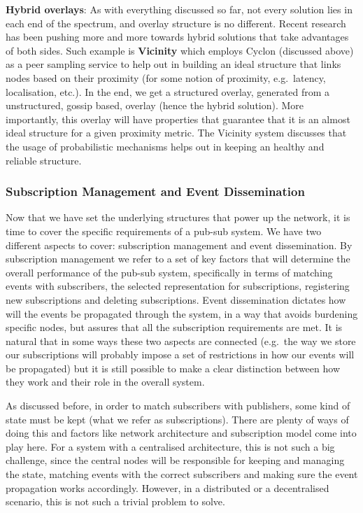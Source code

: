\textbf{Hybrid overlays}: As with everything discussed so far, not every
solution lies in each end of the spectrum, and overlay structure is no
different. Recent research has been pushing more and more towards hybrid
solutions that take advantages of both sides. Such example is
\textbf{Vicinity} \cite{Voulgaris2013} which employs Cyclon
(discussed above) as a peer sampling service to help out in building an
ideal structure that links nodes based on their proximity (for some
notion of proximity, e.g.~latency, localisation, etc.). In the end, we
get a structured overlay, generated from a unstructured, gossip based,
overlay (hence the hybrid solution). More importantly, this overlay will
have properties that guarantee that it is an almost ideal structure for
a given proximity metric. The Vicinity system discusses that the usage
of probabilistic mechanisms helps out in keeping an healthy and reliable
structure.

\subsubsection{Subscription Management and Event
Dissemination}\label{subscription-management-and-event-dissemination}

Now that we have set the underlying structures that power up the
network, it is time to cover the specific requirements of a pub-sub
system. We have two different aspects to cover: subscription management
and event dissemination. By subscription management we refer to a set of
key factors that will determine the overall performance of the pub-sub
system, specifically in terms of matching events with subscribers, the
selected representation for subscriptions, registering new subscriptions
and deleting subscriptions. Event dissemination dictates how will the
events be propagated through the system, in a way that avoids burdening
specific nodes, but assures that all the subscription requirements are
met. It is natural that in some ways these two aspects are connected
(e.g.~the way we store our subscriptions will probably impose a set of
restrictions in how our events will be propagated) but it is still
possible to make a clear distinction between how they work and their
role in the overall system.

As discussed before, in order to match subscribers with publishers, some
kind of state must be kept (what we refer as subscriptions). There are
plenty of ways of doing this and factors like network architecture and
subscription model come into play here. For a system with a centralised
architecture, this is not such a big challenge, since the central nodes
will be responsible for keeping and managing the state, matching events
with the correct subscribers and making sure the event propagation works
accordingly. However, in a distributed or a decentralised scenario, this
is not such a trivial problem to solve.

